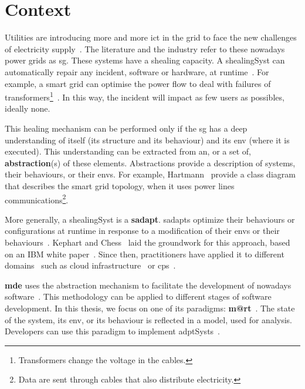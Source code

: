 \section{Context}
Utilities are introducing more and more \gls{ict} in the grid to face the new challenges of electricity supply~\cite{farhangi2010path, ipakchi2009grid, DBLP:journals/comsur/FangMXY12}.
The literature and the industry refer to these nowadays power grids as \gls{sg}.
These systems have a \gls{shealing} capacity.
A \gls{shealingSyst} can automatically repair any incident, software or hardware, at runtime~\cite{DBLP:journals/computer/KephartC03}.
For example, a smart grid can optimise the power flow to deal with failures of transformers\footnote{Transformers change the voltage in the cables.}~\cite{DBLP:journals/comsur/FangMXY12}.
In this way, the incident will impact as few users as possibles, ideally none.

This healing mechanism can be performed only if the \gls{sg} has a deep understanding of itself (its \gls{structure} and its \gls{behaviour}) and its \gls{env} (where it is executed).
This understanding can be extracted from an, or a set of, \textbf{abstraction}(s) of these elements.
Abstractions provide a description of systems, their \glspl{behaviour}, or their \glspl{env}.
For example, Hartmann~\etal \cite{DBLP:conf/smartgridcomm/0001FKTPTR14} provide a class diagram that describes the smart grid topology, when it uses power lines communications\footnote{Data are sent through cables that also distribute electricity.}.

\bigskip

More generally, a \gls{shealingSyst} is a \textbf{\gls{sadapt}}. 
\Glspl{sadapt} optimize their \glspl{behaviour} or configurations at runtime in response to a modification of their \glspl{env} or their \glspl{behaviour}~\cite{DBLP:conf/dagstuhl/ChengLGIMABBBCSDFGGGKKKLMMMPSTTWW09}.
Kephart and Chess~\cite{DBLP:journals/computer/KephartC03} laid the groundwork for this approach, based on an IBM white paper~\cite{computing2006architectural}.
Since then, practitioners have applied it to different domains~\cite{DBLP:journals/corr/abs-1904-01518} such as cloud infrastructure~\cite{DBLP:conf/icac/JavadiG17, OpenStack:Watcher:Wiki, DBLP:conf/icse/BarnaKFL17} or \gls{cps}~\cite{DBLP:conf/icac/LalandaGC17, DBLP:conf/cbse/FouquetMFBPJ12, DBLP:conf/smartgridsec/0001FKNT14}.

\textbf{\Gls{mde}} uses the abstraction mechanism to facilitate the development of nowadays software~\cite{DBLP:journals/computer/Schmidt06, DBLP:conf/ifm/Kent02, DBLP:series/synthesis/2017Brambilla}.
This methodology can be applied to different stages of software development.
In this thesis, we focus on one of its paradigms: \textbf{\gls{m@rt}}~\cite{DBLP:journals/computer/BlairBF09, DBLP:journals/computer/MorinBJFS09}.
The state of the system, its \gls{env}, or its \gls{behaviour} is reflected in a \gls{model}, used for analysis.
Developers can use this paradigm to implement \glspl{adptSyst}~\cite{DBLP:journals/computer/MorinBJFS09, DBLP:conf/smartgridsec/0001FKNT14}.

